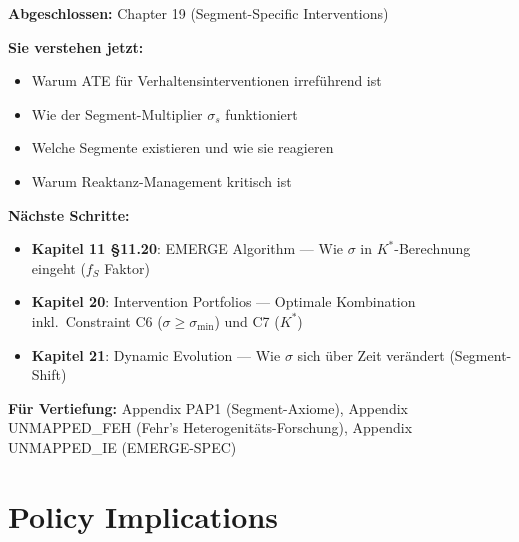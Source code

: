\begin{tcolorbox}[colback=gray!5!white, colframe=gray!75!black,
    title=Empfohlene Lesepfade]

\textbf{Abgeschlossen:} Chapter 19 (Segment-Specific Interventions)

\textbf{Sie verstehen jetzt:}
\begin{itemize}[nosep]
\item Warum ATE für Verhaltensinterventionen irreführend ist
\item Wie der Segment-Multiplier $\sigma_s$ funktioniert
\item Welche Segmente existieren und wie sie reagieren
\item Warum Reaktanz-Management kritisch ist
\end{itemize}

\textbf{Nächste Schritte:}
\begin{itemize}[nosep]
\item \textbf{Kapitel 11 §11.20}: EMERGE Algorithm --- Wie $\sigma$ in $K^*$-Berechnung eingeht ($f_S$ Faktor)
\item \textbf{Kapitel 20}: Intervention Portfolios --- Optimale Kombination inkl.\ Constraint C6 ($\sigma \geq \sigma_{\min}$) und C7 ($K^*$)
\item \textbf{Kapitel 21}: Dynamic Evolution --- Wie $\sigma$ sich über Zeit verändert (Segment-Shift)
\end{itemize}

\textbf{Für Vertiefung:} Appendix PAP1 (Segment-Axiome), Appendix UNMAPPED_FEH (Fehr's Heterogenitäts-Forschung), Appendix UNMAPPED_IE (EMERGE-SPEC)
\end{tcolorbox}



\section*{Policy Implications}

